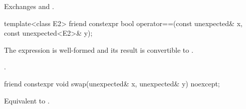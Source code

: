 \begin{itemdescr}
\pnum
\effects
Exchanges  and .
\end{itemdescr}

%
\begin{itemdecl}
template<class E2>
  friend constexpr bool operator==(const unexpected& x, const unexpected<E2>& y);
\end{itemdecl}

\begin{itemdescr}
\pnum
\mandates
The expression  is well-formed and its result is convertible to .

\pnum
\returns
{}.
\end{itemdescr}

%
\begin{itemdecl}
friend constexpr void swap(unexpected& x, unexpected& y) noexcept;
\end{itemdecl}

\begin{itemdescr}
\pnum
\effects
Equivalent to .
\end{itemdescr}

